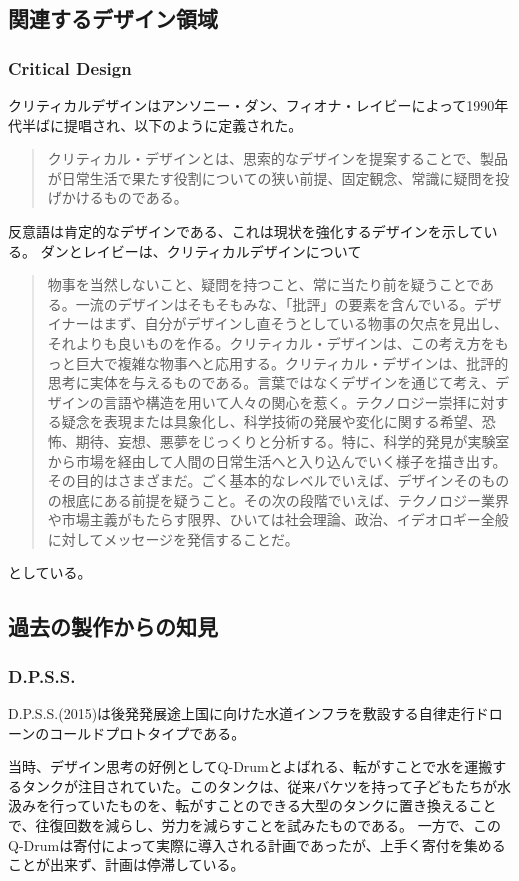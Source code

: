 \documentclass{jsarticle}
\begin{document}
\subsection{関連するデザイン領域}

\subsubsection{Critical Design}
クリティカルデザインはアンソニー・ダン、フィオナ・レイビーによって1990年代半ばに提唱され、以下のように定義された。
\begin{quotation}
  クリティカル・デザインとは、思索的なデザインを提案することで、製品が日常生活で果たす役割についての狭い前提、固定観念、常識に疑問を投げかけるものである。
\end{quotation}
反意語は肯定的なデザインである、これは現状を強化するデザインを示している。
ダンとレイビーは、クリティカルデザインについて
\begin{quotation}
  物事を当然しないこと、疑問を持つこと、常に当たり前を疑うことである。一流のデザインはそもそもみな、「批評」の要素を含んでいる。デザイナーはまず、自分がデザインし直そうとしている物事の欠点を見出し、それよりも良いものを作る。クリティカル・デザインは、この考え方をもっと巨大で複雑な物事へと応用する。クリティカル・デザインは、批評的思考に実体を与えるものである。言葉ではなくデザインを通じて考え、デザインの言語や構造を用いて人々の関心を惹く。テクノロジー崇拝に対する疑念を表現または具象化し、科学技術の発展や変化に関する希望、恐怖、期待、妄想、悪夢をじっくりと分析する。特に、科学的発見が実験室から市場を経由して人間の日常生活へと入り込んでいく様子を描き出す。その目的はさまざまだ。ごく基本的なレベルでいえば、デザインそのものの根底にある前提を疑うこと。その次の段階でいえば、テクノロジー業界や市場主義がもたらす限界、ひいては社会理論、政治、イデオロギー全般に対してメッセージを発信することだ。
\end{quotation}
としている。

\newpage
\subsection{過去の製作からの知見}

\subsubsection{D.P.S.S.}
D.P.S.S.(2015)は後発発展途上国に向けた水道インフラを敷設する自律走行ドローンのコールドプロトタイプである。

当時、デザイン思考の好例としてQ-Drumとよばれる、転がすことで水を運搬するタンクが注目されていた。このタンクは、従来バケツを持って子どもたちが水汲みを行っていたものを、転がすことのできる大型のタンクに置き換えることで、往復回数を減らし、労力を減らすことを試みたものである。
一方で、このQ-Drumは寄付によって実際に導入される計画であったが、上手く寄付を集めることが出来ず、計画は停滞している。
\end{document}
